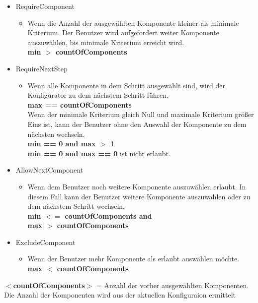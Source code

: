 \documentclass{article}
\begin{document}
\begin{itemize}
    \item RequireComponent 
    \begin{itemize}
        \item Wenn die Anzahl der ausgew\"ahlten Komponente kleiner als minimale
        Kriterium. Der Benutzer wird aufgefordert weiter Komponente
        auszuw\"ahlen, bis minimale Kriterium erreicht wird.\\
        \textbf{min $>$ countOfComponents}
    \end{itemize}
    \item RequireNextStep
        \begin{itemize}
            \item Wenn alle Komponente in dem Schritt ausgew\"ahlt sind, wird
            der Konfigurator zu dem n\"achstem Schritt f\"uhren.\\
            \textbf{max == countOfComponents}\\
            Wenn der minimale Kriterium gleich Null und maximale Kriterium
            gr\"o\ss{}er Eins ist, kann der Benutzer ohne den Auswahl der
            Komponente zu dem n\"achsten wechseln.\\
            \textbf{min == 0 and max $>$ 1}\\
            \textbf{min == 0 and max == 0} ist nicht erlaubt.
        \end{itemize}
    \item AllowNextComponent
    \begin{itemize}
        \item  Wenn dem Benutzer noch weitere Komponente auszuw\"ahlen erlaubt.
        In diesem Fall kann der Benutzer weitere Komponente auszuwahlen oder zu
        dem n\"achstem Schritt wechseln.\\
        \textbf{min $<=$ countOfComponents and\\ max $>$ countOfComponents}
    \end{itemize}
\item ExcludeComponent
    \begin{itemize}
        \item Wenn der Benutzer mehr Komponente als erlaubt ausw\"ahlen
        möchte.\\
        \textbf{max $<$ countOfComponents}
    \end{itemize}
\end{itemize}

\noindent\textbf{$<$countOfComponents$>$} = Anzahl der vorher
ausgew\"ahlten Komponenten.
Die Anzahl der Komponenten wird aus der aktuellen Konfiguraion ermittelt\\\\
\end{document}
